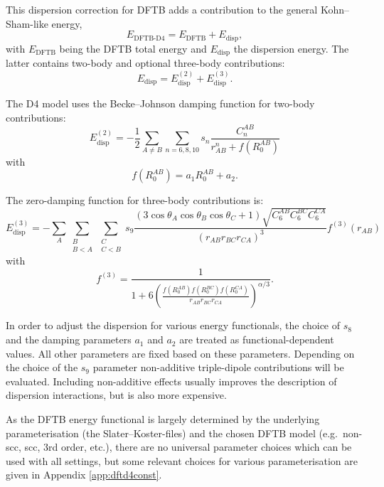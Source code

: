 This dispersion correction for DFTB adds a contribution to the general
Kohn--Sham-like energy,
\begin{equation*}
  E_{\text{DFTB-D4}} = E_{\text{DFTB}} + E_{\text{disp}},
\end{equation*}
with $E_{\text{DFTB}}$ being the DFTB total energy and $E_{\text{disp}}$ the
dispersion energy. The latter contains two-body and optional three-body
contributions:
\begin{equation*}
  E_{\text{disp}} = E_{\text{disp}}^{(2)} + E_{\text{disp}}^{(3)}.
\end{equation*}

The D4 model uses the Becke--Johnson damping function for two-body contributions:
\begin{equation*}
   E_{\text{disp}}^{(2)} = -\frac{1}{2} \sum_{A\neq B} \sum_{n=6,8,10} s_n
   \frac{C_n^{AB}}{r_{AB}^n + f(R_0^{AB})}
\end{equation*}
with
\begin{equation*}
   f(R_0^{AB}) = a_1 R_0^{AB} + a_2.
\end{equation*}

The zero-damping function for three-body contributions is:
\begin{equation*}
   E_{\text{disp}}^{(3)} = -\sum_{A}\sum_{\substack{B \\B < A}}\sum_{\substack{C\\ C < B}} s_9
   \frac{  \left(3\cos\theta_A\cos\theta_B\cos\theta_C+1\right)\sqrt{C_6^{AB}C_6^{BC}C_6^{CA}}}{(r_{AB}r_{BC}r_{CA})^3} f^{(3)}(r_{AB})
\end{equation*}
with
\begin{equation*}
   f^{(3)} = \frac{1}{1 + 6\left(\frac{f(R_0^{AB})f(R_0^{BC})f(R_0^{CA})}{r_{AB}r_{BC}r_{CA}}\right)^{\alpha/3}}.
\end{equation*}

In order to adjust the dispersion for various energy functionals, the choice of
$s_8$ and the damping parameters $a_1$ and $a_2$ are
treated as functional-dependent values. All other parameters are fixed based on
these parameters.
Depending on the choice of the $s_9$ parameter non-additive triple-dipole
contributions will be evaluated. Including non-additive effects usually improves
the description of dispersion interactions, but is also more expensive.

As the DFTB energy functional is largely determined by the underlying
parameterisation (the Slater--Koster-files) and the chosen DFTB model (e.g.\
non-scc, scc, 3rd order, etc.), there are no universal parameter choices which
can be used with all settings, but some relevant choices for various
parameterisation are given in Appendix \ref{app:dftd4const}.

